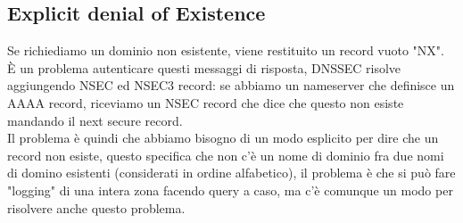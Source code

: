 \documentclass[12pt, oneside]{extbook} %
\begin{document}
\subsection{Explicit denial of Existence}
Se richiediamo un dominio non esistente, viene restituito un record vuoto "NX".
\\È un problema autenticare questi messaggi di risposta, DNSSEC risolve aggiungendo NSEC ed NSEC3 record: se abbiamo un nameserver che definisce un AAAA record, riceviamo un NSEC record che dice che questo non esiste  mandando il next secure record.
\\Il problema è quindi che abbiamo bisogno di un modo esplicito per dire che un record non esiste, questo specifica che non c'è un nome di dominio fra due nomi di domino esistenti (considerati in ordine alfabetico), il problema è che si può fare "logging" di una intera zona facendo query a caso, ma c'è comunque un modo per risolvere anche questo problema.
\end{document}
